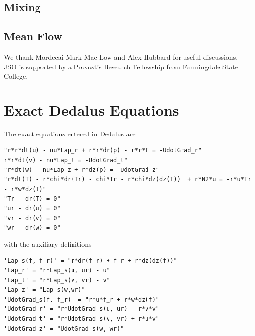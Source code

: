\documentclass{jfm}
\begin{document}
\subsection{Mixing}
\label{sec:mixing}

\subsection{Mean Flow}
\label{sec:meanflow}


We thank Mordecai-Mark Mac Low and Alex Hubbard for useful
discussions. JSO is supported by a Provost's Research Fellowship from
Farmingdale State College.
\appendix
\section{Exact Dedalus Equations}
\label{sec:appendix_dedalus}
The exact equations entered in Dedalus are 
\begin{verbatim}
"r*r*dt(u) - nu*Lap_r + r*r*dr(p) - r*r*T = -UdotGrad_r"
r*r*dt(v) - nu*Lap_t = -UdotGrad_t"
"r*dt(w) - nu*Lap_z + r*dz(p) = -UdotGrad_z"
"r*dt(T) - r*chi*dr(Tr) - chi*Tr - r*chi*dz(dz(T))  + r*N2*u = -r*u*Tr - r*w*dz(T)"
"Tr - dr(T) = 0"
"ur - dr(u) = 0"
"vr - dr(v) = 0"
"wr - dr(w) = 0"
\end{verbatim}
with the auxiliary definitions
\begin{verbatim}
'Lap_s(f, f_r)' = "r*dr(f_r) + f_r + r*dz(dz(f))"
'Lap_r' = "r*Lap_s(u, ur) - u"
'Lap_t' = "r*Lap_s(v, vr) - v"
'Lap_z' = "Lap_s(w,wr)"
'UdotGrad_s(f, f_r)' = "r*u*f_r + r*w*dz(f)"
'UdotGrad_r' = "r*UdotGrad_s(u, ur) - r*v*v"
'UdotGrad_t' = "r*UdotGrad_s(v, vr) + r*u*v"
'UdotGrad_z' = "UdotGrad_s(w, wr)"
\end{verbatim}



\end{document}

